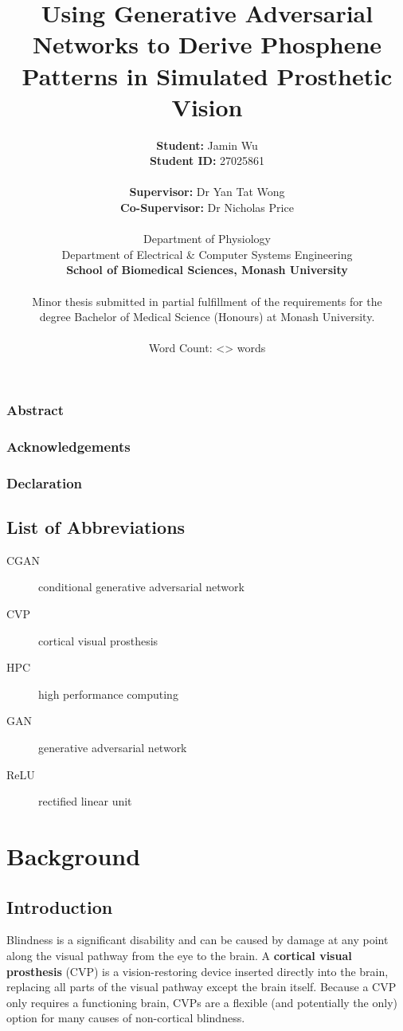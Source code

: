 \documentclass[a4paper,11pt,openany]{book}
\author{\textbf{Student:} Jamin Wu \\ \textbf{Student ID:} 27025861 \\ \\ \textbf{Supervisor:} Dr Yan Tat Wong \\ \textbf{Co-Supervisor:} Dr Nicholas Price \\ \\ Department of Physiology \\ Department of Electrical \& Computer Systems Engineering \\ \textbf{School of Biomedical Sciences, Monash University} \\ \\ Minor thesis submitted in partial fulfillment of the requirements for the \\ degree Bachelor of Medical Science (Honours) at Monash University. \\ \\ Word Count: <> words}
\date{}
\title{\textbf{Using Generative Adversarial Networks to Derive Phosphene Patterns in Simulated Prosthetic Vision}}
\begin{document}
\maketitle
\clearpage

\section*{Abstract}

\clearpage

\section*{Acknowledgements}

\clearpage

\section*{Declaration}

\clearpage

\setcounter{tocdepth}{3}
\tableofcontents

\chapter*{List of Abbreviations}

\begin{description}
\item[{CGAN}] conditional generative adversarial network
\item[{CVP}] cortical visual prosthesis
\item[{HPC}] high performance computing
\item[{GAN}] generative adversarial network
\item[{ReLU}] rectified linear unit
\end{description}

\listoftables
\listoffigures

\part{Background}
\label{sec:org9e45602}
\chapter{Introduction}
\label{sec:orgefd6405}

Blindness is a significant disability and can be caused by damage at any point along the visual pathway from the eye to the brain.
A \textbf{cortical visual prosthesis} (CVP) is a vision-restoring device inserted directly into the brain, replacing all parts of the visual pathway except the brain itself.
Because a CVP only requires a functioning brain, CVPs are a flexible (and potentially the only) option for many causes of non-cortical blindness.
\end{document}
